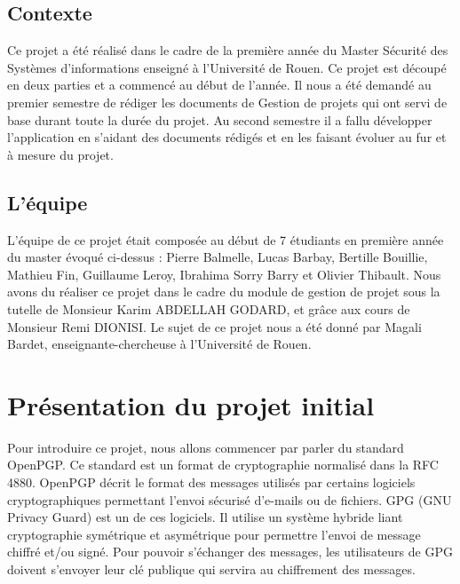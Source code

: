 \documentclass{../res/univ-projet}
\begin{document}
  \subsection{Contexte}
  Ce projet a été réalisé dans le cadre de la première année du Master Sécurité des Systèmes d'informations enseigné à  l'Université de Rouen. Ce projet est découpé en deux parties et a commencé au début de l'année. Il nous a été demandé au premier semestre de rédiger les documents de Gestion de projets qui ont servi de base durant toute la durée du projet. Au second semestre il a fallu développer l'application en s'aidant des documents rédigés et en les faisant évoluer au fur et à mesure du projet.
  \subsection{L'équipe}
  L'équipe de ce projet était composée au début de 7 étudiants en première année du master évoqué ci-dessus : Pierre Balmelle, Lucas Barbay, Bertille Bouillie, Mathieu Fin, Guillaume Leroy, Ibrahima Sorry Barry et Olivier Thibault. Nous avons du réaliser ce projet dans le cadre du module de gestion de projet sous la tutelle de Monsieur Karim ABDELLAH GODARD, et grâce aux cours de Monsieur Remi DIONISI. Le sujet de ce projet nous a été donné par Magali Bardet, enseignante-chercheuse à l'Université de Rouen.

\section{Présentation du projet initial}

Pour introduire ce projet, nous allons commencer par parler du standard OpenPGP. Ce standard est un format de cryptographie normalisé dans la RFC 4880. OpenPGP décrit le format des messages utilisés par certains logiciels cryptographiques permettant l'envoi sécurisé d'e-mails ou de 
fichiers.
GPG (GNU Privacy Guard) est un de ces logiciels. Il utilise un système hybride liant cryptographie symétrique et asymétrique pour permettre l'envoi de message chiffré et/ou signé. Pour pouvoir s'échanger des messages, les utilisateurs de GPG doivent s'envoyer leur clé publique qui servira au chiffrement des messages.
\end{document}
